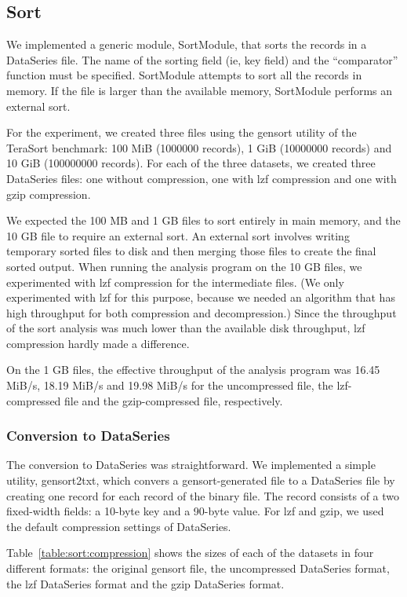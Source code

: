 \subsection{Sort}\label{sec:sort}

We implemented a generic module, SortModule, that sorts the records in a DataSeries file. The name of the sorting field (ie, key field) and the ``comparator'' function must be specified. SortModule attempts to sort all the records in memory. If the file is larger than the available memory, SortModule performs an external sort.

For the experiment, we created three files using the gensort utility of the TeraSort benchmark: 100 MiB (1000000 records), 1 GiB (10000000 records) and 10 GiB (100000000 records). For each of the three datasets, we created three DataSeries files: one without compression, one with lzf compression and one with gzip compression.

We expected the 100 MB and 1 GB files to sort entirely in main memory, and the 10 GB file to require an external sort. An external sort involves writing temporary sorted files to disk and then merging those files to create the final sorted output. When running the analysis program on the 10 GB files, we experimented with lzf compression for the intermediate files. (We only experimented with lzf for this purpose, because we needed an algorithm that has high throughput for both compression and decompression.) Since the throughput of the sort analysis was much lower than the available disk throughput, lzf compression hardly made a difference.

On the 1 GB files, the effective throughput of the analysis program was 16.45 MiB/s, 18.19 MiB/s and 19.98 MiB/s for the uncompressed file, the lzf-compressed file and the gzip-compressed file, respectively.

\subsubsection{Conversion to DataSeries}

The conversion to DataSeries was straightforward. We implemented a simple utility, gensort2txt, which convers a gensort-generated file to a DataSeries file by creating one record for each record of the binary file. The record consists of a two fixed-width fields: a 10-byte key and a 90-byte value. For lzf and gzip, we used the default compression settings of DataSeries.

Table~\ref{table:sort:compression} shows the sizes of each of the datasets in four different formats: the original gensort file, the uncompressed DataSeries format, the lzf DataSeries format and the gzip DataSeries format.



